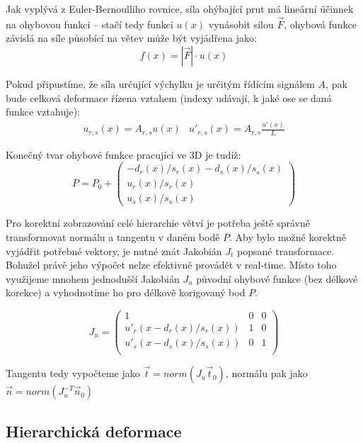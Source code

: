 Jak vyplývá z Euler-Bernoulliho rovnice, síla ohýbající prut má lineární účinnek na ohybovou funkci – stačí tedy funkci $u(x)$ vynásobit silou $\vec{F}$, ohybová funkce závislá na síle působící na větev může být vyjádřena jako:
 \begin{equation}
\label{forceEq}
f(x) = |\vec{F}| \cdot u(x)
\end{equation}

Pokud připustíme, že síla určující výchylku je určitým řídícím signálem $A$, pak bude celková deformace řízena vztahem (indexy udávají, k jaké ose se daná funkce vztahuje):
\begin{equation}
\begin{array}{cc}
u_{r,s}(x) = A_{r,s}u(x) & {u}'_{r,s}(x) = A_{r,s}\frac{{u}'(x)}{L}
\end{array}
\end{equation}


Konečný tvar ohybové funkce pracující ve 3D je tudíž:
\begin{equation}
P = P_0 + \begin{pmatrix}
-d_r(x)/ s_r(x)-d_s(x)/s_s(x) \\ u_r(x)/s_r(x) \\ u_s(x)/s_s(x)
\end{pmatrix}
\end{equation}

Pro korektní zobrazování celé hierarchie větví je potřeba ještě správně transformovat normálu a tangentu v daném bodě $P$. Aby bylo možné korektně vyjádřit potřebné vektory, je nutné znát Jakobián $J_t$ popsané transformace. Bohužel právě jeho výpočet nelze efektivně provádět v real-time. Místo toho využijeme mnohem jednodušší Jakobián $J_u$ původní ohybové funkce (bez délkové korekce) a vyhodnotíme ho pro délkově korigovaný bod $P$.

\begin{equation}
J_{u} = \begin{pmatrix}
1 & 0 &0 \\
{u}'_r(x-d_r(x)/s_r(x)) & 1 & 0\\
{u}'_s(x-d_s(x)/s_s(x)) & 0 & 1\\
\end{pmatrix}
\end{equation}

Tangentu tedy vypočteme jako $\vec{t} = norm(J_{u}\vec{t}_{0})$, normálu pak jako $\vec{n} = norm(J_{u}^{-T}\vec{n}_{0})$

\subsection{Hierarchická deformace}

